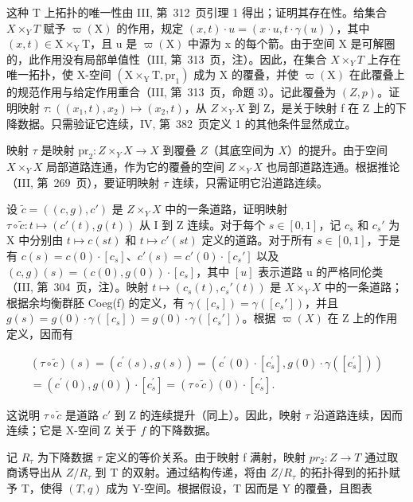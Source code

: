 这种 T 上拓扑的唯一性由 III, 第~312~页引理 1 得出；证明其存在性。给集合 \(X\times_{Y}T\) 赋予 \(\varpi(\mathrm{X})\) 的作用，规定 \((x,t)\cdot u=(x\cdot u,t\cdot\gamma(u))\)，其中 \((x,t)\in\mathrm{X}\times_{\mathrm{Y}}\mathrm{T}\)，且 u 是 \(\varpi(\mathrm{X})\) 中源为 x 的每个箭。由于空间 X 是可解圈的，此作用没有局部单值性（III, 第~313~页，注）。因此，在集合 \(X\times_{Y}T\) 上存在唯一拓扑，使 X-空间 \((\mathrm{X}\times_{\mathrm{Y}}\mathrm{T},\mathrm{pr}_{1})\) 成为 X 的覆叠，并使 \(\varpi(\mathrm{X})\) 在此覆叠上的规范作用与给定作用重合（III, 第~313~页，命题 3）。记此覆叠为 \((Z,p)\)。证明映射 \(\tau: ((x_{1},t),x_{2})\mapsto(x_{2},t)\)，从 \(Z\times_{Y}X\) 到 Z，是关于映射 f 在 Z 上的下降数据。只需验证它连续，IV, 第~382~页定义 1 的其他条件显然成立。

映射 \(\tau\) 是映射 \(\mathrm{pr}_2\colon Z\times_Y X\to X\) 到覆叠 \(Z\)（其底空间为 \(X\)）的提升。由于空间 \(X\times_Y X\) 局部道路连通，作为它的覆叠的空间 \(Z\times_Y X\) 也局部道路连通。根据推论（III, 第~269~页），要证明映射 \(\tau\) 连续，只需证明它沿道路连续。

设 \(\widetilde{c} = ((c,g),c')\) 是 \(Z\times_{Y}X\) 中的一条道路，证明映射 \(\tau \circ \widetilde{c}\colon t\mapsto (c'(t),g(t))\) 从 I 到 Z 连续。对于每个 \(s\in [0,1]\)，记 \(c_s\) 和 \(c_s'\) 为 X 中分别由 \(t\mapsto c(st)\) 和 \(t\mapsto c'(st)\) 定义的道路。对于所有 \(s\in [0,1]\)，于是有 \(c(s) = c(0)\cdot [c_s]\)、\(c'(s) = c'(0)\cdot [c_s']\) 以及 \((c,g)(s) = (c(0),g(0))\cdot [c_s]\)，其中 \([u]\) 表示道路 u 的严格同伦类（III, 第~304~页，注）。映射 \(t\mapsto (c_s(t),c_s'(t))\) 是 \(X\times_{Y}X\) 中的一条道路；根据余均衡群胚 Coeg(f) 的定义，有 \(\gamma ([c_s]) = \gamma ([c_s'])\)，并且 \(g(s) = g(0)\cdot \gamma ([c_s]) = g(0)\cdot \gamma ([c_s'])\)。根据 \(\varpi (X)\) 在 Z 上的作用定义，因而有

\[
\begin{array}{r} (\tau \circ \widetilde {c}) (s) = (c ^ {\prime} (s), g (s)) = (c ^ {\prime} (0) \cdot [ c _ {s} ^ {\prime} ], g (0) \cdot \gamma ([ c _ {s} ^ {\prime} ])) \\ = (c ^ {\prime} (0), g (0)) \cdot [ c _ {s} ^ {\prime} ] = (\tau \circ \widetilde {c}) (0) \cdot [ c _ {s} ^ {\prime} ]. \end{array}
\]

这说明 \(\tau \circ \widetilde{c}\) 是道路 \(c'\) 到 Z 的连续提升（同上）。因此，映射 \(\tau\) 沿道路连续，因而连续；它是 X-空间 Z 关于 \(f\) 的下降数据。

记 \(R_{\tau}\) 为下降数据 \(\tau\) 定义的等价关系。由于映射 f 满射，映射 \(pr_{2}: Z \to T\) 通过取商诱导出从 \(Z/R_{\tau}\) 到 T 的双射。通过结构传递，将由 \(Z/R_{\tau}\) 的拓扑得到的拓扑赋予 T，使得 \((T,q)\) 成为 Y-空间。根据假设，T 因而是 Y 的覆叠，且图表

